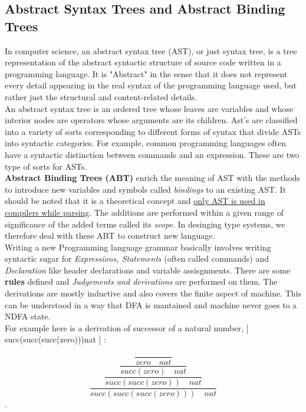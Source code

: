 \subsection{Abstract Syntax Trees and Abstract Binding Trees}
In computer science, an abstract syntax tree (AST), or just syntax tree, is a tree representation of the abstract syntactic structure of source code written in a programming language. It is "Abstract" in the sense that it does not represent every detail appearing in the real syntax of the programming language used, but rather just the structural and content-related details.\\

An abstract syntax tree is an ordered tree whose leaves are variables and whose interior nodes are operators whose arguments are its children. Ast’s are classified into a variety of sorts corresponding to different forms of syntax that divide ASTs into syntactic categories. For example, common programming languages often have a syntactic distinction between commands and an expression. These are two type of sorts for ASTs.\\

\textbf{Abstract Binding Trees (ABT)} enrich the meaning of AST with the methods to introduce new variables and symbols called \textit{bindings} to an existing AST. It should be noted that it is a theoretical concept and \underline{only AST is used in compilers while parsing}. The additions are performed within a given range of significance of the added terms called its \textit{scope}. In desinging type systems, we therefore deal with these ABT to construct new language.\\ 

Writing a new Programming language grammar basically involves writing syntactic sugar for \textit{Expressions, Statements }(often called commands) and \textit{Declaration} like header declarations and variable assisgnments. There are some \textbf{rules} defined and \textit{Judgements and derivations} are performed on them. The derivations are mostly inductive and also covers the finite aspect of machine. This can be understood in a way that DFA is mantained and machine never goes to a NDFA state.\\

For example here is a derivation of successor of a natural number, [ succ(succ(succ(zero)))nat ] : 

\[\dfrac{\dfrac{\dfrac{\dfrac{}{zero\quad nat}}{succ(zero) \quad nat}}{succ(succ(zero)) \quad nat}}{succ(succ(succ(zero))) \quad nat} \] .

